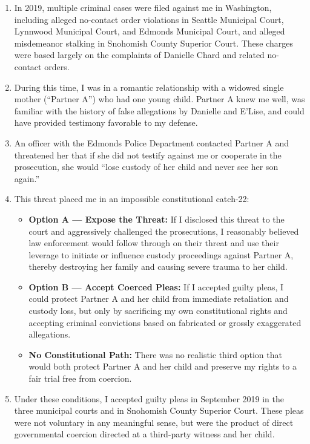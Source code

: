 \documentclass[12pt,letterpaper]{article}
\begin{document}
\begin{enumerate}

\item In 2019, multiple criminal cases were filed against me in Washington, including alleged no-contact order violations in Seattle Municipal Court, Lynnwood Municipal Court, and Edmonds Municipal Court, and alleged misdemeanor stalking in Snohomish County Superior Court. These charges were based largely on the complaints of Danielle Chard and related no-contact orders.

\item During this time, I was in a romantic relationship with a widowed single mother (``Partner A'') who had one young child. Partner A knew me well, was familiar with the history of false allegations by Danielle and E'Lise, and could have provided testimony favorable to my defense.

\item An officer with the Edmonds Police Department contacted Partner A and threatened her that if she did not testify against me or cooperate in the prosecution, she would ``lose custody of her child and never see her son again.''

\item This threat placed me in an impossible constitutional catch-22:

\begin{itemize}
  \item \textbf{Option A --- Expose the Threat:} If I disclosed this threat to the court and aggressively challenged the prosecutions, I reasonably believed law enforcement would follow through on their threat and use their leverage to initiate or influence custody proceedings against Partner A, thereby destroying her family and causing severe trauma to her child.

  \item \textbf{Option B --- Accept Coerced Pleas:} If I accepted guilty pleas, I could protect Partner A and her child from immediate retaliation and custody loss, but only by sacrificing my own constitutional rights and accepting criminal convictions based on fabricated or grossly exaggerated allegations.

  \item \textbf{No Constitutional Path:} There was no realistic third option that would both protect Partner A and her child and preserve my rights to a fair trial free from coercion.
\end{itemize}

\item Under these conditions, I accepted guilty pleas in September 2019 in the three municipal courts and in Snohomish County Superior Court. These pleas were not voluntary in any meaningful sense, but were the product of direct governmental coercion directed at a third-party witness and her child.


\end{enumerate}
\end{document}
